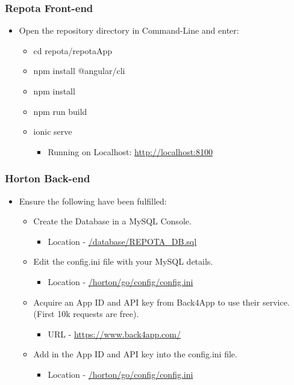 \newpage
\subsubsection{Repota Front-end}
\begin{itemize}
  \item Open the repository directory in Command-Line and enter:
    \begin{itemize}
    \item cd repota/repotaApp
    \item npm install @angular/cli
    \item npm install
    \item npm run build
    \item ionic serve
    \begin{itemize}
        \item Running on Localhost: \url{http://localhost:8100}
    \end{itemize}
    \end{itemize}
\end{itemize}

\subsubsection{Horton Back-end}
\begin{itemize}
  \item Ensure the following have been fulfilled:
    \begin{itemize}
    \item Create the Database in a MySQL Console.
        \begin{itemize}
            \item Location - \url{/database/REPOTA_DB.sql}
        \end{itemize}
    \item Edit the config.ini file with your MySQL details.
        \begin{itemize}
            \item Location - \url{/horton/go/config/config.ini}
        \end{itemize}
    \item Acquire an App ID and API key from Back4App to use their service. (First 10k requests are free).
        \begin{itemize}
            \item URL - \url{https://www.back4app.com/}
        \end{itemize}
    \item Add in the App ID and API key into the config.ini file.
        \begin{itemize}
            \item Location - \url{/horton/go/config/config.ini}
        \end{itemize}
    \end{itemize}
\end{itemize}

